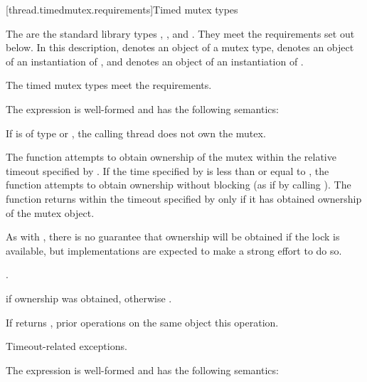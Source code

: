 [thread.timedmutex.requirements]{Timed mutex types}

\pnum
The  are the standard library types ,
, and . They
meet the requirements set out below.
In this description,  denotes an object of a mutex type,
 denotes an object of an
instantiation of , and  denotes an
object of an
instantiation of .

\pnum
The timed mutex types meet the 
requirements.

\pnum
The expression  is well-formed
and has the following semantics:

\begin{itemdescr}
\pnum
\expects
If  is of type  or
, the calling thread does not
own the mutex.

\pnum
\effects
The function attempts to obtain ownership of the mutex within the
relative timeout
specified by . If the time specified by  is less than or
equal to , the function attempts to obtain ownership without blocking (as if by calling
). The function returns within the timeout specified by
 only if it has obtained ownership of the mutex object.
\begin{note}
As
with , there is no guarantee that ownership will be obtained if the
lock is available, but implementations are expected to make a strong effort to do so.
\end{note}

\pnum
\returntype {}.

\pnum
\returns
{} if ownership was obtained, otherwise .

\pnum
\sync
If  returns , prior  operations
on the same object  this operation.

\pnum
\throws
Timeout-related exceptions.
\end{itemdescr}

\pnum
The expression  is well-formed
and has the following semantics:

